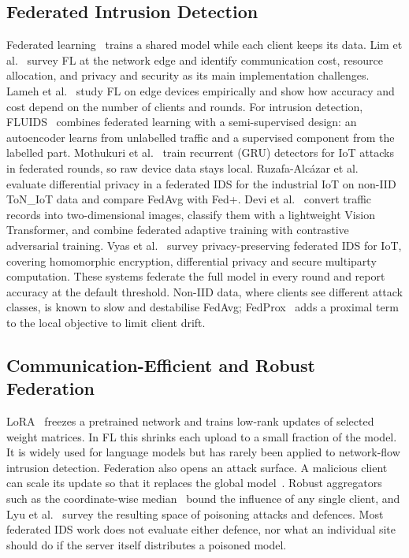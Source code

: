 \subsection{Federated Intrusion Detection}
Federated learning~\cite{mcmahan2017} trains a shared model while each client
keeps its data. Lim et al.~\cite{lim2020} survey FL at the network edge and
identify communication cost, resource allocation, and privacy and security as
its main implementation challenges. Lameh et al.~\cite{lameh2020} study FL on
edge devices empirically and show how accuracy and cost depend on the number
of clients and rounds. For intrusion detection, FLUIDS~\cite{aouedi2022fluids}
combines federated learning with a semi-supervised design: an autoencoder
learns from unlabelled traffic and a supervised component from the labelled
part. Mothukuri et al.~\cite{mothukuri2022} train recurrent (GRU) detectors
for IoT attacks in federated rounds, so raw device data stays local.
Ruzafa-Alc\'{a}zar et al.~\cite{ruzafa2023} evaluate differential privacy in
a federated IDS for the industrial IoT on non-IID ToN\_IoT data and compare
FedAvg with Fed+. Devi et al.~\cite{devi2025fatvit} convert traffic records
into two-dimensional images, classify them with a lightweight Vision
Transformer, and combine federated adaptive training with contrastive
adversarial training. Vyas et al.~\cite{iot_survey} survey privacy-preserving
federated IDS for IoT, covering homomorphic encryption, differential privacy
and secure multiparty computation. These systems federate the full model in
every round and report accuracy at the default threshold. Non-IID data,
where clients see different attack classes, is known to slow and destabilise
FedAvg; FedProx~\cite{li2020fedprox} adds a proximal term to the local
objective to limit client drift.

\subsection{Communication-Efficient and Robust Federation}
LoRA~\cite{hu2022lora} freezes a pretrained network and trains low-rank
updates of selected weight matrices. In FL this shrinks each upload to a
small fraction of the model. It is widely used for language models but has
rarely been applied to network-flow intrusion detection. Federation also
opens an attack surface. A malicious client can scale its update so that it
replaces the global model~\cite{bagdasaryan2020}. Robust aggregators such as
the coordinate-wise median~\cite{yin2018} bound the influence of any single
client, and Lyu et al.~\cite{lyu2022} survey the resulting space of poisoning
attacks and defences. Most federated IDS work does not evaluate either
defence, nor what an individual site should do if the server itself
distributes a poisoned model.


